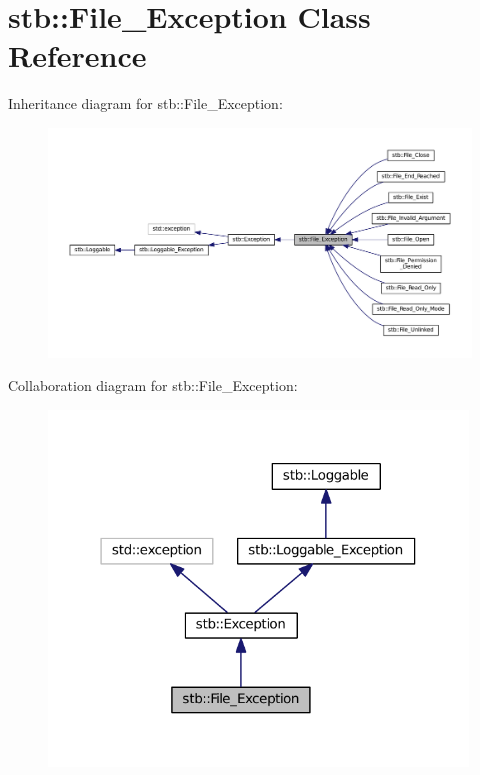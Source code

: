 \hypertarget{classstb_1_1File__Exception}{\section{stb\+:\+:File\+\_\+\+Exception Class Reference}
\label{classstb_1_1File__Exception}
}


Inheritance diagram for stb\+:\+:File\+\_\+\+Exception\+:
\nopagebreak
\begin{figure}[H]
\begin{center}
\leavevmode
\includegraphics[width=350pt]{classstb_1_1File__Exception__inherit__graph}
\end{center}
\end{figure}


Collaboration diagram for stb\+:\+:File\+\_\+\+Exception\+:
\nopagebreak
\begin{figure}[H]
\begin{center}
\leavevmode
\includegraphics[width=316pt]{classstb_1_1File__Exception__coll__graph}
\end{center}
\end{figure}
